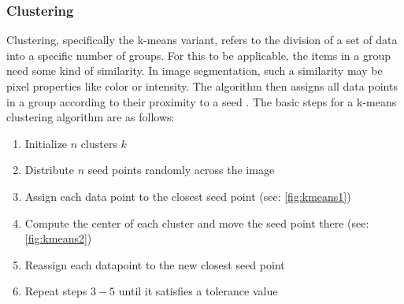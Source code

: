 \subsubsection{Clustering}
Clustering, specifically the k-means variant, refers to the division of a set of data into
a specific number of groups.
For this to be applicable, the items in a group need some kind of similarity.
In image segmentation, such a similarity may be pixel properties like color or intensity.
The algorithm then assigns all data points in a group according to their proximity to a seed \cite{dhanachandraImageSegmentationUsing2015}.
The basic steps for a k-means clustering algorithm are as follows:
\begin{enumerate}
	\item Initialize $n$ clusters $k$
	\item Distribute $n$ seed points randomly across the image
	\item Assign each data point to the closest seed point (see: \cref{fig:kmeans1})
	\item Compute the center of each cluster and move the seed point there (see: \cref{fig:kmeans2})
	\item Reassign each datapoint to the new closest seed point
	\item Repeat steps $3 - 5$ until it satisfies a tolerance value
\end{enumerate}
